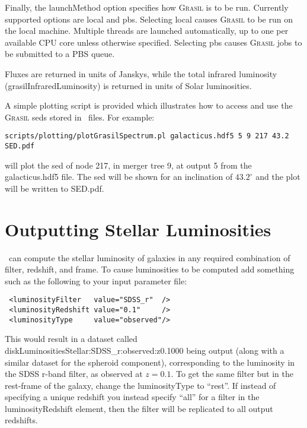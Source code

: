 Finally, the {\normalfont launchMethod} option specifies how {\normalfont \scshape Grasil} is to be run. Currently supported options are {\normalfont \ttfamily local} and {\normalfont \ttfamily pbs}. Selecting {\normalfont \ttfamily local} causes {\normalfont \scshape Grasil} to be run on the local machine. Multiple threads are launched automatically, up to one per available CPU core unless otherwise specified. Selecting {\normalfont \ttfamily pbs} causes {\normalfont \scshape Grasil} jobs to be submitted to  a PBS queue.

Fluxes are returned in units of Janskys, while the total infrared luminosity ({\normalfont \ttfamily grasilInfraredLuminosity}) is returned in units of Solar luminosities.

A simple plotting script is provided which illustrates how to access and use the {\normalfont \scshape Grasil} \glspl{sed} stored in \glc\ files. For example:
\begin{verbatim}
scripts/plotting/plotGrasilSpectrum.pl galacticus.hdf5 5 9 217 43.2 SED.pdf
\end{verbatim}
will plot the \gls{sed} of node 217, in merger tree 9, at output 5 from the {\normalfont \ttfamily galacticus.hdf5} file. The \gls{sed} will be shown for an inclination of $43.2^\circ$ and the plot will be written to {\normalfont \ttfamily SED.pdf}.

\section{Outputting Stellar Luminosities}

\glc\ can compute the stellar luminosity of galaxies in any required combination of filter, redshift, and frame. To cause luminosities to be computed add something such as the following to your input parameter file:
\begin{verbatim}
 <luminosityFilter   value="SDSS_r"  />
 <luminosityRedshift value="0.1"     />
 <luminosityType     value="observed"/>
\end{verbatim}
This would result in a dataset called {\normalfont \ttfamily diskLuminositiesStellar:SDSS\_r:observed:z0.1000} being output (along with a similar dataset for the spheroid component), corresponding to the luminosity in the SDSS r-band filter, as observed at $z=0.1$. To get the same filter but in the rest-frame of the galaxy, change the {\normalfont \ttfamily luminosityType} to ``{\normalfont \ttfamily rest}''. If instead of specifying a unique redshift you instead specify ``{\normalfont \ttfamily all}'' for a filter in the {\normalfont \ttfamily luminosityRedshift} element, then the filter will be replicated to all output redshifts.

